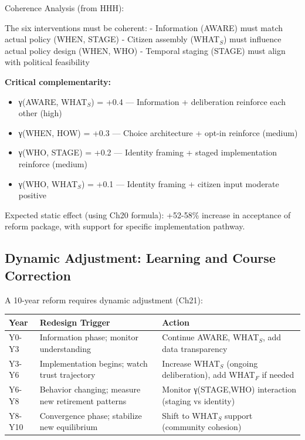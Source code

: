 Coherence Analysis (from HHH):

The six interventions must be coherent:
- Information (AWARE) must match actual policy (WHEN, STAGE)
- Citizen assembly (WHAT$_S$) must influence actual policy design (WHEN, WHO)
- Temporal staging (STAGE) must align with political feasibility

\textbf{Critical complementarity:}
\begin{itemize}
\item γ(AWARE, WHAT$_S$) = +0.4 --- Information + deliberation reinforce each other (high)
\item γ(WHEN, HOW) = +0.3 --- Choice architecture + opt-in reinforce (medium)
\item γ(WHO, STAGE) = +0.2 --- Identity framing + staged implementation reinforce (medium)
\item γ(WHO, WHAT$_S$) = +0.1 --- Identity framing + citizen input moderate positive
\end{itemize}

Expected static effect (using Ch20 formula): +52-58\% increase in acceptance of reform package, with support for specific implementation pathway.

\subsection{Dynamic Adjustment: Learning and Course Correction}

A 10-year reform requires dynamic adjustment (Ch21):

\begin{center}
\begin{tabular}{@{}lll@{}}
\toprule
\textbf{Year} & \textbf{Redesign Trigger} & \textbf{Action} \\
\midrule
Y0-Y3 & Information phase; monitor understanding & Continue AWARE, WHAT$_S$, add data transparency \\
Y3-Y6 & Implementation begins; watch trust trajectory & Increase WHAT$_S$ (ongoing deliberation), add WHAT$_F$ if needed \\
Y6-Y8 & Behavior changing; measure new retirement patterns & Monitor γ(STAGE,WHO) interaction (staging vs identity) \\
Y8-Y10 & Convergence phase; stabilize new equilibrium & Shift to WHAT$_S$ support (community cohesion) \\
\midrule
\end{tabular}
\end{center}

